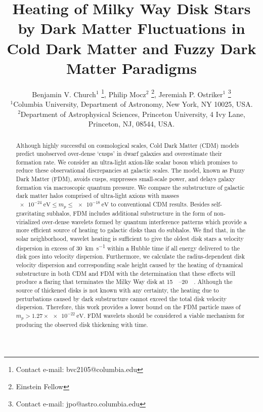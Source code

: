 \documentclass[usenatbib]{mnras}
\newcommand{\squote}[1]{\lq #1\rq}
\newcommand{\poweV}[1]{\SI{e#1}{\electronvolt}}
\begin{document}
\title[Dark Matter Heating]{Heating of Milky Way Disk Stars by Dark Matter Fluctuations in Cold Dark Matter and Fuzzy Dark Matter Paradigms}
\author[B. V. Church and J. P. Ostriker]{
Benjamin V. Church$^{1}$ \thanks{Contact e-mail: bvc2105@columbia.edu}, Philip Mocz$^{2}$ \thanks{Einstein Fellow},
Jeremiah P. Ostriker$^{1}$ \thanks{Contact e-mail: jpo@astro.columbia.edu}
\\
$^{1}$Columbia University, Department of Astronomy, New York, NY 10025, USA.
\\
$^{2}$Department of Astrophysical Sciences, Princeton University, 4 Ivy Lane, Princeton, NJ, 08544, USA.}
\maketitle
\begin{abstract}
Although highly successful on  cosmological scales, Cold Dark Matter (CDM) models predict unobserved over-dense \squote{cusps} in dwarf galaxies and overestimate their formation rate. We consider an ultra-light axion-like scalar boson which promises to reduce these observational discrepancies at galactic scales. The model, known as Fuzzy Dark Matter (FDM), avoids cusps, suppresses small-scale power, and delays galaxy formation via macroscopic quantum pressure. We compare the substructure of galactic dark matter halos comprised of ultra-light axions with masses $\poweV{-24} \leq m_p \leq \poweV{-18}$ to conventional CDM results. Besides self-gravitating subhalos, FDM includes additional substructure in the form of non-virialized over-dense wavelets formed by quantum interference patterns which provide a more efficient source of heating to galactic disks than do subhalos. We find that, in the solar neighborhood, wavelet heating is sufficient to give the oldest disk stars a velocity dispersion in excess of \SI{30}{\kilo\meter\per\second} within a Hubble time if all energy delivered to the disk goes into velocity dispersion. 
Furthermore, we calculate the radius-dependent disk velocity dispersion and corresponding scale height caused by the heating of dynamical substructure in both CDM and FDM with the determination that these effects will produce a flaring that terminates the Milky Way disk at \SIrange{15}{20}{\kilo \parsec}. Although the source of thickened disks is not known with any certainty, the heating due to perturbations caused by dark substructure cannot exceed the total disk velocity dispersion. Therefore, this work provides a lower bound on the FDM particle mass of $m_p > 1.27 \times \SI{e-22}{\electronvolt}$. FDM wavelets should be considered a viable mechanism for producing the observed disk thickening with time.
\end{abstract}
\end{document}
